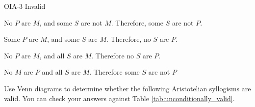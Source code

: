 \begin{exercises}
{ OIA-3 Invalid 
} 
 
\item No $P$ are $M$, and some $S$ are not $M$. Therefore, some $S$ are not $P$.
 
\item Some $P$ are $M$, and some $S$ are $M$. Therefore, no $S$ are $P$.

\item No $P$ are $M$, and all $S$ are $M$. Therefore no $S$ are $P$.
\item No $M$ are $P$ and all $S$ are $M$. Therefore some $S$ are not $P$
\end{exercises}

\noindent \problempart Use Venn diagrams to determine whether the following Aristotelian syllogisms are valid. You can check your answers against Table \ref{tab:unconditionally_valid}.

